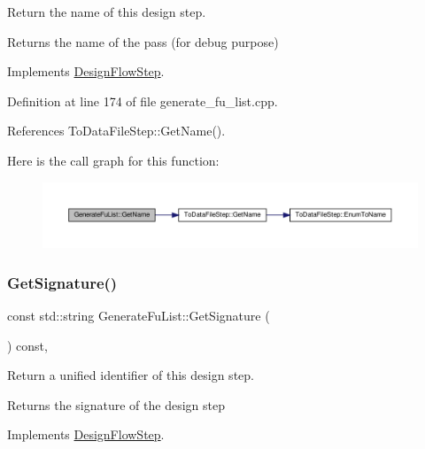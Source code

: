 Return the name of this design step. 

\begin{DoxyReturn}{Returns}
the name of the pass (for debug purpose) 
\end{DoxyReturn}


Implements \hyperlink{classDesignFlowStep_a01e5ebfab88db3b3b7f832f80075fad8}{Design\+Flow\+Step}.



Definition at line 174 of file generate\+\_\+fu\+\_\+list.\+cpp.



References To\+Data\+File\+Step\+::\+Get\+Name().

Here is the call graph for this function\+:
\nopagebreak
\begin{figure}[H]
\begin{center}
\leavevmode
\includegraphics[width=350pt]{db/dea/classGenerateFuList_a0b6efa299b9de2bc45157d9e28a97a9e_cgraph}
\end{center}
\end{figure}
\mbox{\label{classGenerateFuList_a7bd13ddbc7a4b82d834a9cd0812d4b90}} 
\subsubsection{\texorpdfstring{Get\+Signature()}{GetSignature()}}
{\footnotesize\ttfamily const std\+::string Generate\+Fu\+List\+::\+Get\+Signature (\begin{DoxyParamCaption}{ }\end{DoxyParamCaption}) const\hspace{0.3cm}{\ttfamily [override]}, {\ttfamily [virtual]}}



Return a unified identifier of this design step. 

\begin{DoxyReturn}{Returns}
the signature of the design step 
\end{DoxyReturn}


Implements \hyperlink{classDesignFlowStep_ab111e3d4058615c2dedc0505978d4699}{Design\+Flow\+Step}.



